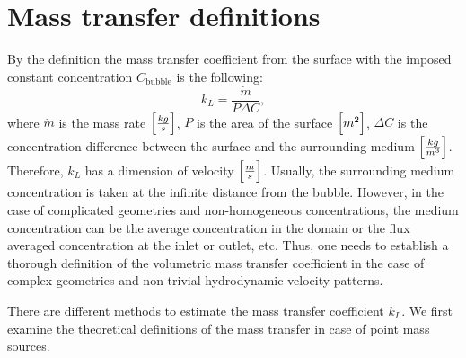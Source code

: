 \documentclass{article}
\newcommand{\beq}{\begin{equation}}
\newcommand{\feq}{\end{equation}}
\newcommand{\cbubble}{C_{\mathrm{bubble}}}
\begin{document}
\section{Mass transfer definitions}
By the definition the mass transfer coefficient from the surface with the imposed constant
concentration $\cbubble$ is the following:
\beq
\label{eq:main:definition}
k_L=\frac{\dot{m}}{P \Delta C},
\feq
where $\dot{m}$ is the mass rate $\Bigl[\frac{kg}{s}\Bigr]$, $P$ is the area of the surface
$\Bigl[m^2\Bigr]$, $\Delta C$ is the concentration difference between the surface and the surrounding medium
$\Bigl[\frac{kg}{m^3}\Bigr]$. Therefore, $k_L$ has a dimension of velocity
$\Bigl[\frac{m}{s}\Bigr]$. Usually, the surrounding medium concentration is taken at the infinite distance
from the bubble. However, in the case of complicated geometries and non-homogeneous concentrations, 
the medium concentration can be the average concentration in the domain or the flux averaged
concentration at the inlet or outlet, etc. Thus, one needs to establish a thorough definition of the volumetric
mass transfer coefficient in the case of complex geometries and non-trivial hydrodynamic velocity patterns.

There are different methods to estimate the mass transfer coefficient $k_L$. We first examine the
theoretical definitions of the mass transfer in case of point mass sources.
\end{document}
